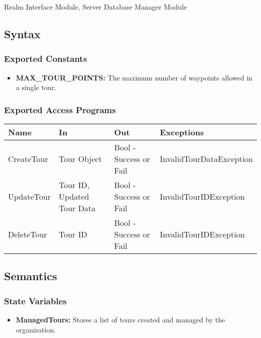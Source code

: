 \documentclass[12pt, titlepage]{article}
\begin{document}
Realm Interface Module, Server Database Manager Module

\subsection{Syntax}

\subsubsection{Exported Constants}

\begin{itemize}
  \item \textbf{MAX\_TOUR\_POINTS:} The maximum number of waypoints allowed in a single tour.
\end{itemize}

\subsubsection{Exported Access Programs}

\begin{center}
  \begin{tabular}{p{2.5cm} p{4cm} p{4cm} p{5cm}}
    \hline
    \textbf{Name} & \textbf{In}                & \textbf{Out}           & \textbf{Exceptions}      \\
    \hline
    CreateTour    & Tour Object                & Bool - Success or Fail & InvalidTourDataException \\
    \hline
    UpdateTour    & Tour ID, Updated Tour Data & Bool - Success or Fail & InvalidTourIDException   \\
    \hline
    DeleteTour    & Tour ID                    & Bool - Success or Fail & InvalidTourIDException   \\
    \hline
  \end{tabular}
\end{center}

\subsection{Semantics}

\subsubsection{State Variables}

\begin{itemize}
  \item \textbf{ManagedTours:} Stores a list of tours created and managed by the organization.
\end{itemize}
\end{document}

